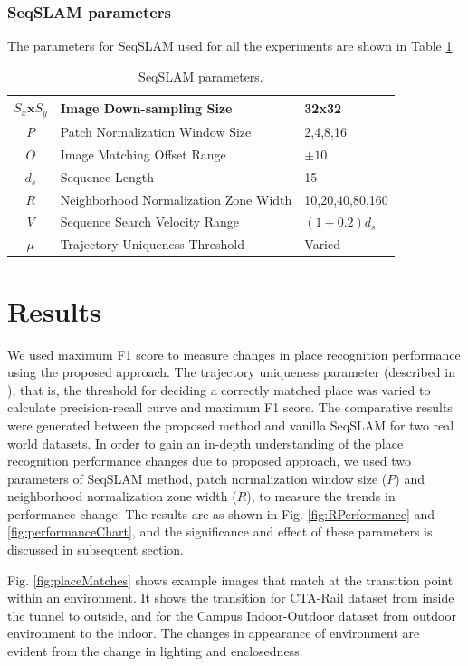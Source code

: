\documentclass[letterpaper, 10 pt, conference]{ieeeconf}  %
\begin{document}
\subsubsection{SeqSLAM parameters}
The parameters for SeqSLAM used for all the experiments are shown in Table \ref{table:seqSLAMParams}.

\begin{table}[!h]
	\caption{SeqSLAM parameters.}
	\begin{tabular}{|c|p{4cm}|p{2.5cm}|}
		\hline
		$S_x\mathbf{x}S_y$ & Image Down-sampling Size & 32x32 \\
		\hline
		$P$ & Patch Normalization Window Size & {2,4,8,16} \\
		\hline
		$O$ & Image Matching Offset Range & $\pm10$ \\
		\hline
		$d_s$ & Sequence Length & 15 \\
		\hline
		$R$ & Neighborhood Normalization Zone Width & {10,20,40,80,160} \\
		\hline
		$V$ & Sequence Search Velocity Range & $(1\pm0.2)d_s$ \\
		\hline
		$\mu$ & Trajectory Uniqueness Threshold & Varied \\
		\hline
	\end{tabular}
	\label{table:seqSLAMParams}
\end{table}

\section{Results}
We used maximum F1 score to measure changes in place recognition performance using the proposed approach. The trajectory uniqueness parameter (described in \cite{Milford2012}), that is, the threshold for deciding a correctly matched place was varied to calculate precision-recall curve and maximum F1 score. The comparative results were generated between the proposed method and vanilla SeqSLAM for two real world datasets. In order to gain an in-depth understanding of the place recognition performance changes due to proposed approach, we used two parameters of SeqSLAM method, patch normalization window size ($P$) and neighborhood normalization zone width ($R$), to measure the trends in performance change. The results are as shown in Fig. \ref{fig:RPerformance} and \ref{fig:performanceChart}, and the significance and effect of these parameters is discussed in subsequent section. 

Fig. \ref{fig:placeMatches} shows example images that match at the transition point within an environment. It shows the transition for CTA-Rail dataset from inside the tunnel to outside, and for the Campus Indoor-Outdoor dataset from outdoor environment to the indoor. The changes in appearance of environment are evident from the change in lighting and enclosedness.
\end{document}
